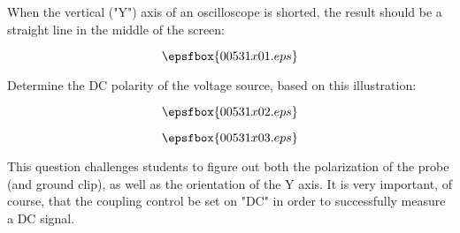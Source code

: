 

When the vertical ("Y") axis of an oscilloscope is shorted, the result should be a straight line in the middle of the screen:

$$\epsfbox{00531x01.eps}$$

Determine the DC polarity of the voltage source, based on this illustration:

$$\epsfbox{00531x02.eps}$$







$$\epsfbox{00531x03.eps}$$







This question challenges students to figure out both the polarization of the probe (and ground clip), as well as the orientation of the Y axis.  It is very important, of course, that the coupling control be set on "DC" in order to successfully measure a DC signal.




